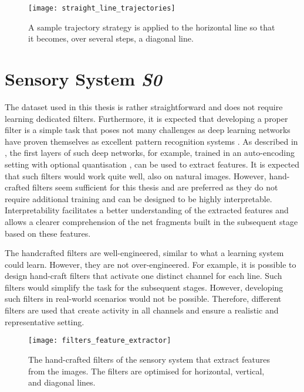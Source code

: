 \begin{figure}[h]
    \centering
    \texttt{[image: straight\_line\_trajectories]}
    \caption[Sample line trajectory strategy]{A sample trajectory strategy is applied to the horizontal line so that it becomes, over several steps, a diagonal line.}
\end{figure}


\section{Sensory System \emph{S0}}
The dataset used in this thesis is rather straightforward and does not require learning dedicated filters.
Furthermore, it is expected that developing a proper filter is a simple task that poses not many challenges as deep learning networks have proven themselves as excellent pattern recognition systems .
As described in , the first layers of such deep networks, for example, trained in an auto-encoding setting  with optional quantisation , can be used to extract features.
It is expected that such filters would work quite well, also on natural images.
However, hand-crafted filters seem sufficient for this thesis and are preferred as they do not require additional training and can be designed to be highly interpretable. Interpretability facilitates a better understanding of the extracted features and allows a clearer comprehension of the net fragments built in the subsequent stage based on these features. 

The handcrafted filters are well-engineered, similar to what a learning system could learn.
However, they are not over-engineered. For example, it is possible to design hand-craft filters that activate one distinct channel for each line.
Such filters would simplify the task for the subsequent stages.
However, developing such filters in real-world scenarios would not be possible.
Therefore, different filters are used that create activity in all channels and ensure a realistic and representative setting.

\begin{figure}[h]
    \centering
    \texttt{[image: filters\_feature\_extractor]}
    \caption[Hand-crafted filters of the sensory system]{The hand-crafted filters of the sensory system that extract features from the images. The filters are optimised for horizontal, vertical, and diagonal lines.}
\end{figure}

